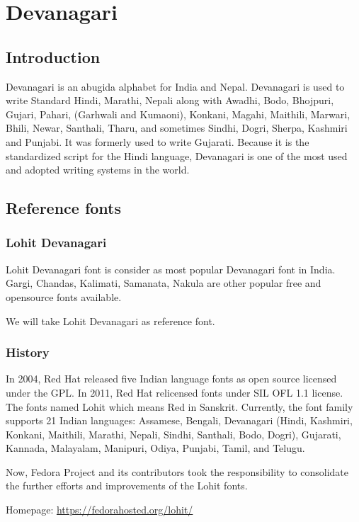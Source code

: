 \chapter{Devanagari}
\section{Introduction}

Devanagari is an abugida alphabet for India and Nepal. Devanagari is used to
write Standard Hindi, Marathi, Nepali along with Awadhi, Bodo, Bhojpuri,
Gujari, Pahari, (Garhwali and Kumaoni), Konkani, Magahi, Maithili, Marwari,
Bhili, Newar, Santhali, Tharu, and sometimes Sindhi, Dogri, Sherpa, Kashmiri
and Punjabi. It was formerly used to write Gujarati. Because it is the
standardized script for the Hindi language, Devanagari is one of the most used
and adopted writing systems in the world.

\section{Reference fonts}

\subsection{Lohit Devanagari}
Lohit Devanagari font is consider as most popular Devanagari font in India.
Gargi, Chandas, Kalimati, Samanata, Nakula are other popular free and
opensource fonts available.

We will take Lohit Devanagari as reference font.

\subsection{History}
In 2004, Red Hat released five Indian language fonts as open source licensed
under the GPL. In 2011, Red Hat relicensed fonts under SIL OFL 1.1 license.
The fonts named Lohit which means Red in Sanskrit. Currently, the font family
supports 21 Indian languages: Assamese, Bengali, Devanagari (Hindi, Kashmiri,
Konkani, Maithili, Marathi, Nepali, Sindhi, Santhali, Bodo, Dogri), Gujarati,
Kannada, Malayalam, Manipuri, Odiya, Punjabi, Tamil, and Telugu.

Now, Fedora Project and its contributors took the responsibility to consolidate
the further efforts and improvements of the Lohit fonts.

Homepage: {\url{https://fedorahosted.org/lohit/}}
